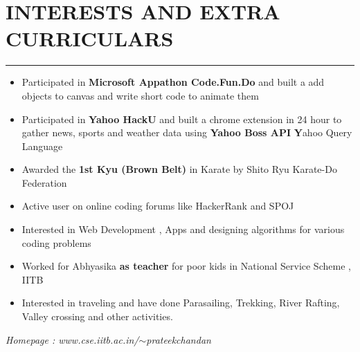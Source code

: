 \documentclass[11pt]{article} %
\begin{document}
\section*{INTERESTS AND EXTRA CURRICULARS}
\hrule
\medskip
\begin{itemize}
\itemsep-0.4em
\item Participated in \textbf{Microsoft Appathon Code.Fun.Do} and built a add objects to canvas and write short code to animate them
\item Participated in \textbf{Yahoo HackU} and built a chrome extension in 24 hour to gather news, sports and weather data using {\bf Yahoo Boss API} {\textbf Yahoo Query Language}
\item Awarded the \textbf{1st Kyu (Brown Belt)} in Karate by Shito Ryu Karate-Do Federation
\item Active user on online coding forums like HackerRank and SPOJ
\item Interested in Web Development , Apps and designing algorithms for various coding problems
\item Worked for Abhyasika \textbf{as teacher }for poor kids in National Service Scheme , IITB
\item Interested in traveling and  have done Parasailing, Trekking, River Rafting, Valley crossing 
and other activities.
\end{itemize}
\textit{Homepage : www.cse.iitb.ac.in/$\sim$prateekchandan}
\end{document}
